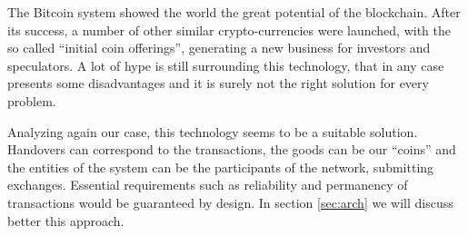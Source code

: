 The Bitcoin system showed the world the great potential of the blockchain. After its success, a number of other similar crypto-currencies were launched, with the so called ``initial coin offerings'', generating a new business for investors and speculators. A lot of hype is still surrounding this technology, that in any case presents some disadvantages and it is surely not the right solution for every problem. 

Analyzing again our case, this technology seems to be a suitable solution. Handovers can correspond to the transactions, the goods can be our ``coins'' and the entities of the system can be the participants of the network, submitting exchanges. Essential requirements such as reliability and permanency of transactions would be guaranteed by design. In section \ref{sec:arch} we will discuss better this approach.

